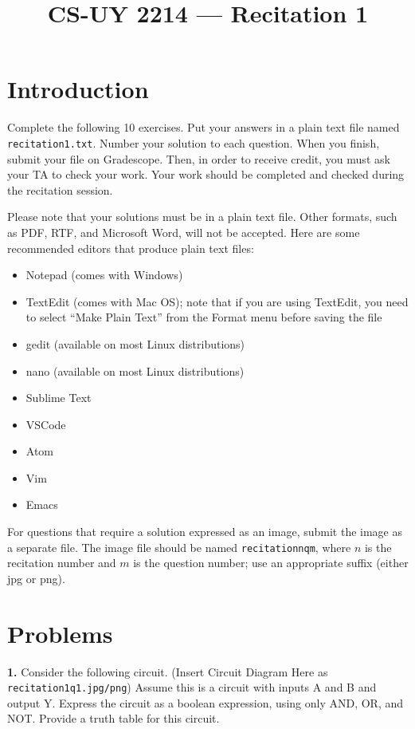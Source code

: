\documentclass{article}
\begin{document}
\title{CS-UY 2214 — Recitation 1}
\date{}
\maketitle

\section*{Introduction}
Complete the following 10 exercises. Put your answers in a plain text file named \texttt{recitation1.txt}. Number your solution to each question. When you finish, submit your file on Gradescope. Then, in order to receive credit, you must ask your TA to check your work. Your work should be completed and checked during the recitation session.

Please note that your solutions must be in a plain text file. Other formats, such as PDF, RTF, and Microsoft Word, will not be accepted. Here are some recommended editors that produce plain text files:
\begin{itemize}
    \item Notepad (comes with Windows)
    \item TextEdit (comes with Mac OS); note that if you are using TextEdit, you need to select “Make Plain Text” from the Format menu before saving the file
    \item gedit (available on most Linux distributions)
    \item nano (available on most Linux distributions)
    \item Sublime Text
    \item VSCode
    \item Atom
    \item Vim
    \item Emacs
\end{itemize}

For questions that require a solution expressed as an image, submit the image as a separate file. The image file should be named \texttt{recitationnqm}, where $n$ is the recitation number and $m$ is the question number; use an appropriate suffix (either jpg or png).

\section*{Problems}
\noindent\textbf{1.} Consider the following circuit.  (Insert Circuit Diagram Here as \texttt{recitation1q1.jpg/png})  Assume this is a circuit with inputs A and B and output Y.  Express the circuit as a boolean expression, using only AND, OR, and NOT. Provide a truth table for this circuit.
\end{document}
